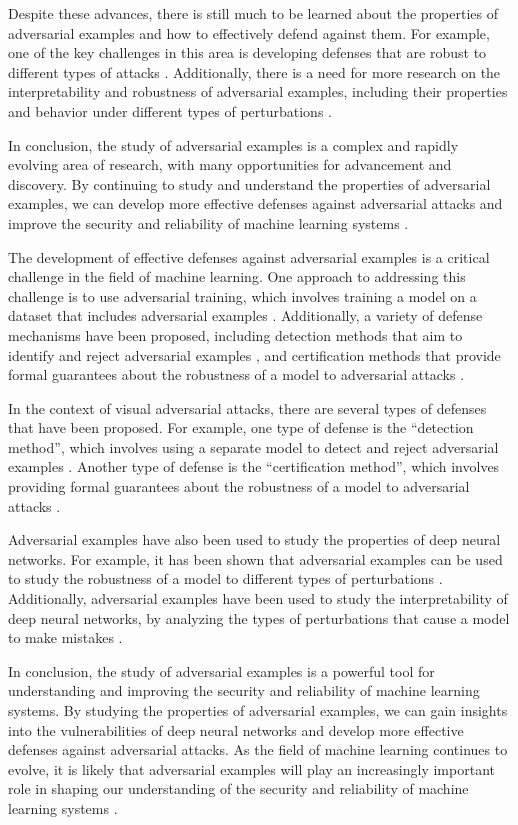 \documentclass[11pt]{article}
\begin{document}
Despite these advances, there is still much to be learned about the properties of adversarial examples and how to effectively defend against them. For example, one of the key challenges in this area is developing defenses that are robust to different types of attacks \cite{ref30}. Additionally, there is a need for more research on the interpretability and robustness of adversarial examples, including their properties and behavior under different types of perturbations \cite{ref23}.

In conclusion, the study of adversarial examples is a complex and rapidly evolving area of research, with many opportunities for advancement and discovery. By continuing to study and understand the properties of adversarial examples, we can develop more effective defenses against adversarial attacks and improve the security and reliability of machine learning systems \cite{ref29}.

The development of effective defenses against adversarial examples is a critical challenge in the field of machine learning. One approach to addressing this challenge is to use adversarial training, which involves training a model on a dataset that includes adversarial examples \cite{ref27}. Additionally, a variety of defense mechanisms have been proposed, including detection methods that aim to identify and reject adversarial examples \cite{ref25}, and certification methods that provide formal guarantees about the robustness of a model to adversarial attacks \cite{ref26}.

In the context of visual adversarial attacks, there are several types of defenses that have been proposed. For example, one type of defense is the ``detection method'', which involves using a separate model to detect and reject adversarial examples \cite{ref25}. Another type of defense is the ``certification method'', which involves providing formal guarantees about the robustness of a model to adversarial attacks \cite{ref26}.

Adversarial examples have also been used to study the properties of deep neural networks. For example, it has been shown that adversarial examples can be used to study the robustness of a model to different types of perturbations \cite{ref23}. Additionally, adversarial examples have been used to study the interpretability of deep neural networks, by analyzing the types of perturbations that cause a model to make mistakes \cite{ref28}.

In conclusion, the study of adversarial examples is a powerful tool for understanding and improving the security and reliability of machine learning systems. By studying the properties of adversarial examples, we can gain insights into the vulnerabilities of deep neural networks and develop more effective defenses against adversarial attacks. As the field of machine learning continues to evolve, it is likely that adversarial examples will play an increasingly important role in shaping our understanding of the security and reliability of machine learning systems \cite{ref29}.
\end{document}
